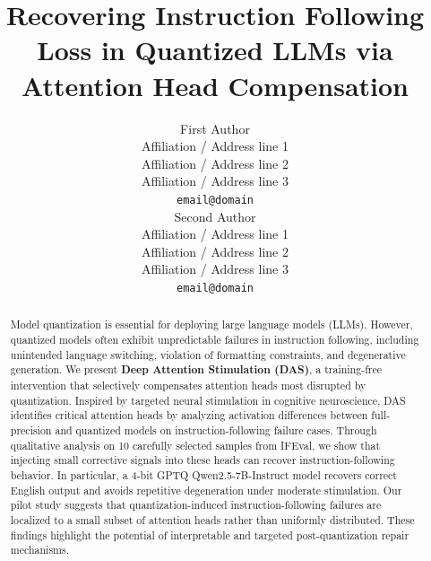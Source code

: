 \documentclass[11pt]{article}
\title{Recovering Instruction Following Loss in Quantized LLMs via Attention Head Compensation}
\author{First Author \\
  Affiliation / Address line 1 \\
  Affiliation / Address line 2 \\
  Affiliation / Address line 3 \\
  \texttt{email@domain} \\\And
  Second Author \\
  Affiliation / Address line 1 \\
  Affiliation / Address line 2 \\
  Affiliation / Address line 3 \\
  \texttt{email@domain} \\}
\begin{document}
\maketitle
\begin{abstract}

Model quantization is essential for deploying large language models (LLMs). However, quantized models often exhibit unpredictable failures in instruction following, including unintended language switching, violation of formatting constraints, and degenerative generation.
We present \textbf{Deep Attention Stimulation (DAS)}, a training-free intervention that selectively compensates attention heads most disrupted by quantization. Inspired by targeted neural stimulation in cognitive neuroscience, DAS identifies critical attention heads by analyzing activation differences between full-precision and quantized models on instruction-following failure cases. Through qualitative analysis on 10 carefully selected samples from IFEval, we show that injecting small corrective signals into these heads can recover instruction-following behavior.
In particular, a 4-bit GPTQ Qwen2.5-7B-Instruct model recovers correct English output and avoids repetitive degeneration under moderate stimulation. Our pilot study suggests that quantization-induced instruction-following failures are localized to a small subset of attention heads rather than uniformly distributed. These findings highlight the potential of interpretable and targeted post-quantization repair mechanisms.
\end{abstract}
\end{document}
